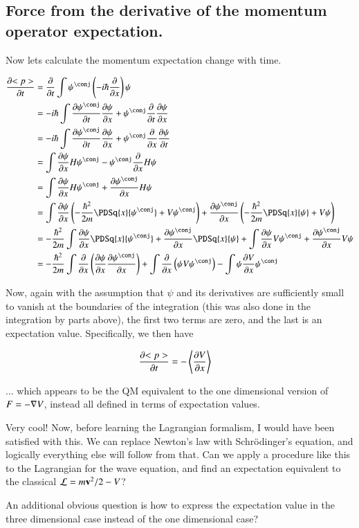 \subsection{Force from the derivative of the momentum operator expectation. }

Now lets calculate the momentum expectation change with time.

\begin{align*}
\PD{t}{<p>} 
&= \PD{t}{} \int \psi^\conj \left(-i \hbar \PD{x}{}\right) \psi \\
&= -i \hbar \int \PD{t}{\psi^\conj} \PD{x}{\psi} +{\psi^\conj} \PD{t}{}\PD{x}{\psi} \\
&= -i \hbar \int \PD{t}{\psi^\conj} \PD{x}{\psi} +{\psi^\conj} \PD{x}{}\PD{t}{\psi} \\
&= \int \PD{x}{\psi} H \psi^\conj - {\psi^\conj} \PD{x}{} H\psi \\
&= \int \PD{x}{\psi} H \psi^\conj + \PD{x}{\psi^\conj} H\psi \\
&= 
\int \PD{x}{\psi} \left(- \frac{\hbar^2}{2m} \PDSq{x}{\psi^\conj} + V\psi^\conj \right)
+ \PD{x}{\psi^\conj} \left(- \frac{\hbar^2}{2m} \PDSq{x}{\psi} + V\psi \right) 
\\
&= 
-
\frac{\hbar^2}{2m} 
\int \PD{x}{\psi} \PDSq{x}{\psi^\conj} + \PD{x}{\psi^\conj} \PDSq{x}{\psi} 
+\int \PD{x}{\psi} V\psi^\conj + \PD{x}{\psi^\conj} V\psi 
\\
&= 
- \frac{\hbar^2}{2m} \int \PD{x}{}\left(\PD{x}{\psi} \PD{x}{\psi^\conj}\right)
+\int \PD{x}{} \left( \psi V\psi^\conj \right) -\int \psi \PD{x}{V} \psi^\conj 
\\
\end{align*}

Now, again with the assumption that $\psi$ and its derivatives are sufficiently small to vanish at the boundaries of the integration (this was also done in the integration by parts above), the first two terms are zero, and the last is an expectation value.  Specifically, we then have

\begin{align}
\PD{t}{<p>} &= - \left<\PD{x}{V}\right>
\end{align}

... which appears to be the QM equivalent to the one dimensional version of $F = -\grad V$, instead all defined in terms of expectation values.

Very cool!  Now, before learning the Lagrangian formalism, I would have been satisfied with this.  We can replace Newton's law with 
Schr\"{o}dinger's equation, and logically everything else will follow from that.  Can we apply a procedure like this to 
the Lagrangian for the wave equation, and find an expectation equivalent to the classical $\LL = m\Bv^2/2 - V$?

An additional obvious question is how to express the expectation value in the three dimensional case instead of the one dimensional case?

%
%

%
